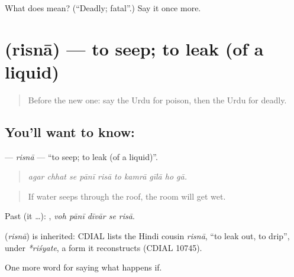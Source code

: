 \begin{tcolorbox}[breakable,colback=teal!4,colframe=teal!35!black,title={Before you move on}]
What does   mean? (\textquotedblleft{}Deadly; fatal\textquotedblright{}.) Say it once more.
\end{tcolorbox}
\section[\texorpdfstring{\ur{رسنا} (risnā)}{رسنا (risnā)}]{ (risnā) — to seep; to leak (of a liquid)}

\label{lesson:UR-C371-risna}



\begin{quote}
Before the new one: say the Urdu for poison, then the Urdu for deadly.
\end{quote}

\subsection*{You'll want to know: }
\textbf{} — \emph{risnā} — \textquotedblleft{}to seep; to leak (of a liquid)\textquotedblright{}.

\begin{quote}
         
\end{quote}

\begin{quote}
\emph{agar chhat se pānī risā to kamrā gīlā ho gā.}
\end{quote}

\begin{quote}
If water seeps through the roof, the room will get wet.
\end{quote}

Past (it …):     , \emph{voh pānī dīvār se risā}.

\begin{cousinweb}
\textbf{} (\emph{risnā}) is inherited: CDIAL lists the Hindi cousin \emph{risnā}, \textquotedblleft{}to leak out, to drip\textquotedblright{}, under \emph{*riśyate}, a form it reconstructs (CDIAL 10745).
\end{cousinweb}

\begin{grammarlens}[title={What you've built}]
One more word for saying what happens if.
\end{grammarlens}


